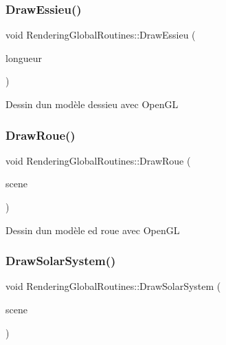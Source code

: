 \subsubsection{\texorpdfstring{DrawEssieu()}{DrawEssieu()}}
{\footnotesize\ttfamily void Rendering\+Global\+Routines\+::\+Draw\+Essieu (\begin{DoxyParamCaption}\item[{double}]{longueur }\end{DoxyParamCaption})\hspace{0.3cm}{\ttfamily [static]}}

Dessin d\textquotesingle{}un modèle d\textquotesingle{}essieu avec Open\+GL \mbox{\label{structRenderingGlobalRoutines_af7a121c7b024c10c68ca70946a17af77}} 
\subsubsection{\texorpdfstring{DrawRoue()}{DrawRoue()}}
{\footnotesize\ttfamily void Rendering\+Global\+Routines\+::\+Draw\+Roue (\begin{DoxyParamCaption}\item[{\mbox{\hyperlink{classVoiture}{Voiture}} \&}]{scene }\end{DoxyParamCaption})\hspace{0.3cm}{\ttfamily [static]}}

Dessin d\textquotesingle{}un modèle ed roue avec Open\+GL \mbox{\label{structRenderingGlobalRoutines_a66996f7d19dd141a86439768657acb61}} 
\subsubsection{\texorpdfstring{DrawSolarSystem()}{DrawSolarSystem()}}
{\footnotesize\ttfamily void Rendering\+Global\+Routines\+::\+Draw\+Solar\+System (\begin{DoxyParamCaption}\item[{\mbox{\hyperlink{classSystemeSolaire}{Systeme\+Solaire}} \&}]{scene }\end{DoxyParamCaption})\hspace{0.3cm}{\ttfamily [static]}}


